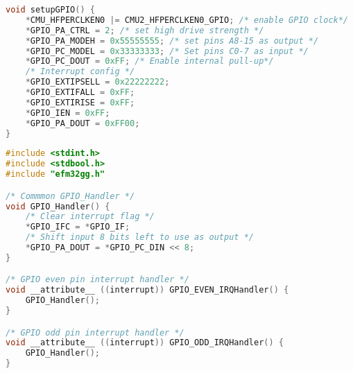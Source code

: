\begin{lstlisting}[language=C, label=EX1-C-gpio, caption=gpio.c]
void setupGPIO() { 
    *CMU_HFPERCLKEN0 |= CMU2_HFPERCLKEN0_GPIO; /* enable GPIO clock*/
    *GPIO_PA_CTRL = 2; /* set high drive strength */
    *GPIO_PA_MODEH = 0x55555555; /* set pins A8-15 as output */
    *GPIO_PC_MODEL = 0x33333333; /* Set pins C0-7 as input */
    *GPIO_PC_DOUT = 0xFF; /* Enable internal pull-up*/
    /* Interrupt config */
    *GPIO_EXTIPSELL = 0x22222222;
    *GPIO_EXTIFALL = 0xFF;
    *GPIO_EXTIRISE = 0xFF;
    *GPIO_IEN = 0xFF;
    *GPIO_PA_DOUT = 0xFF00;
}
\end{lstlisting}

\begin{lstlisting}[language=C, label=EX1-C-interrupt-handler, caption=interrupt_handlers.c]
#include <stdint.h>
#include <stdbool.h>
#include "efm32gg.h"

/* Commmon GPIO_Handler */
void GPIO_Handler() {
    /* Clear interrupt flag */
    *GPIO_IFC = *GPIO_IF;
    /* Shift input 8 bits left to use as output */
    *GPIO_PA_DOUT = *GPIO_PC_DIN << 8;
}

/* GPIO even pin interrupt handler */
void __attribute__ ((interrupt)) GPIO_EVEN_IRQHandler() {
    GPIO_Handler();
}

/* GPIO odd pin interrupt handler */
void __attribute__ ((interrupt)) GPIO_ODD_IRQHandler() {
    GPIO_Handler();
}
\end{lstlisting}
